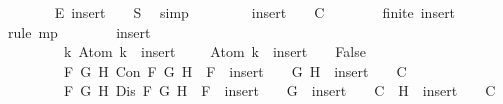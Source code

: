 \begin{isabellebody}
\ \ \ \ \ \ \isamarkupfalse%
\ E\ {\isacartoucheopen}{\isacharparenleft}insert\ {\isasymbottom}\ {\isacharbraceleft}{\isacharbraceright}{\isacharparenright}\ {\isasymsubseteq}\ S{\isacartoucheclose}\ \isamarkupfalse%
\ simp\ \isanewline
\ \ \ \ \isamarkupfalse%
\ \isamarkupfalse%
\ {\isachardoublequoteopen}{\isacharparenleft}insert\ {\isasymbottom}\ {\isacharbraceleft}{\isacharbraceright}{\isacharparenright}\ {\isasymin}\ C{\isachardoublequoteclose}\isanewline
\ \ \ \ \ \ \isamarkupfalse%
\ {\isacartoucheopen}finite\ {\isacharparenleft}insert\ {\isasymbottom}\ {\isacharbraceleft}{\isacharbraceright}{\isacharparenright}{\isacartoucheclose}\ \isamarkupfalse%
\ {\isacharparenleft}rule\ mp{\isacharparenright}\isanewline
\ \ \ \ \isamarkupfalse%
\ {\isachardoublequoteopen}{\isasymbottom}\ {\isasymnotin}\ {\isacharparenleft}insert\ {\isasymbottom}\ {\isacharbraceleft}{\isacharbraceright}{\isacharparenright}\ {\isasymand}\isanewline
\ \ \ \ \ \ \ \ \ {\isacharparenleft}{\isasymforall}k{\isachardot}\ Atom\ k\ {\isasymin}\ {\isacharparenleft}insert\ {\isasymbottom}\ {\isacharbraceleft}{\isacharbraceright}{\isacharparenright}\ {\isasymlongrightarrow}\ \isactrlbold {\isasymnot}\ {\isacharparenleft}Atom\ k{\isacharparenright}\ {\isasymin}\ {\isacharparenleft}insert\ {\isasymbottom}\ {\isacharbraceleft}{\isacharbraceright}{\isacharparenright}\ {\isasymlongrightarrow}\ False{\isacharparenright}\ {\isasymand}\isanewline
\ \ \ \ \ \ \ \ \ {\isacharparenleft}{\isasymforall}F\ G\ H{\isachardot}\ Con\ F\ G\ H\ {\isasymlongrightarrow}\ F\ {\isasymin}\ {\isacharparenleft}insert\ {\isasymbottom}\ {\isacharbraceleft}{\isacharbraceright}{\isacharparenright}\ {\isasymlongrightarrow}\ {\isacharbraceleft}G{\isacharcomma}\ H{\isacharbraceright}\ {\isasymunion}\ {\isacharparenleft}insert\ {\isasymbottom}\ {\isacharbraceleft}{\isacharbraceright}{\isacharparenright}\ {\isasymin}\ C{\isacharparenright}\ {\isasymand}\isanewline
\ \ \ \ \ \ \ \ \ {\isacharparenleft}{\isasymforall}F\ G\ H{\isachardot}\ Dis\ F\ G\ H\ {\isasymlongrightarrow}\ F\ {\isasymin}\ {\isacharparenleft}insert\ {\isasymbottom}\ {\isacharbraceleft}{\isacharbraceright}{\isacharparenright}\ {\isasymlongrightarrow}\ {\isacharbraceleft}G{\isacharbraceright}\ {\isasymunion}\ {\isacharparenleft}insert\ {\isasymbottom}\ {\isacharbraceleft}{\isacharbraceright}{\isacharparenright}\ {\isasymin}\ C\ {\isasymor}\ {\isacharbraceleft}H{\isacharbraceright}\ {\isasymunion}\ {\isacharparenleft}insert\ {\isasymbottom}\ {\isacharbraceleft}{\isacharbraceright}{\isacharparenright}\ {\isasymin}\ C{\isacharparenright}{\isachardoublequoteclose}\isanewline

\end{isabellebody}
